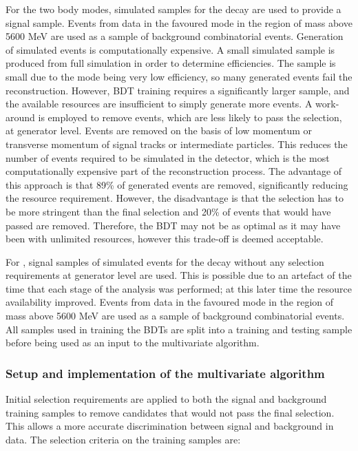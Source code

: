 For the two body modes, simulated samples for the decay \kpi are used to provide a signal sample. Events from data in the favoured \kpi mode in the region of \Bm mass above 5600 MeV are used as a sample of background combinatorial events. Generation of simulated events is computationally expensive. A small simulated sample is produced from full \lhcb simulation in order to determine efficiencies. The sample is small due to the mode being very low efficiency, so many generated events fail the reconstruction. However, BDT training requires a significantly larger sample, and the available resources are insufficient to simply generate more events. A work-around is employed to remove events, which are less likely to pass the selection, at generator level. Events are removed on the basis of low momentum or transverse momentum of signal tracks or intermediate particles. This reduces the number of events required to be simulated in the \lhcb detector, which is the most computationally expensive part of the reconstruction process. The advantage of this approach is that 89\% of generated events are removed, significantly reducing the resource requirement. However, the disadvantage is that the selection has to be more stringent than the final selection and 20\% of events that would have passed are removed. Therefore, the BDT may not be as optimal as it may have been with unlimited resources, however this trade-off is deemed acceptable.

For \kpipipi, signal samples of simulated events for the decay without any selection requirements at generator level are used. This is possible due to an artefact of the time that each stage of the analysis was performed; at this later time the resource availability improved. Events from data in the favoured \kpipipi mode in the region of \Bm mass above 5600 MeV are used as a sample of background combinatorial events. All samples used in training the BDTs are split into a training and testing sample before being used as an input to the multivariate algorithm.

\subsubsection{Setup and implementation of the multivariate algorithm}

Initial selection requirements are applied to both the signal and background training samples to remove candidates that would not pass the final selection. This allows a more accurate discrimination between signal and background in data. The selection criteria on the training samples are:

